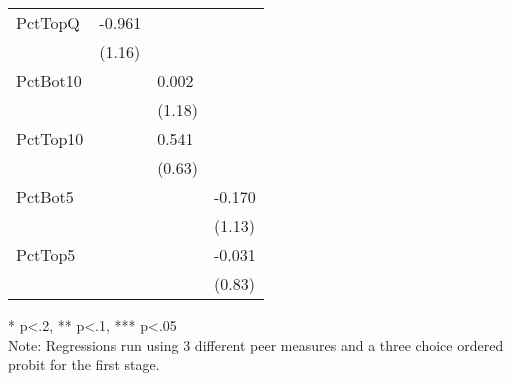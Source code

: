 \begin{table}[htb]
\begin{threeparttable}
\begin{tabular}{l l l l}
      PctTopQ  & -0.961                        &                               &                              \\
               & (1.16)                        &                               &                              \\
      PctBot10 &                               & 0.002                         &                              \\
               &                               & (1.18)                        &                              \\
      PctTop10 &                               & 0.541                         &                              \\
               &                               & (0.63)                        &                              \\
      PctBot5  &                               &                               & -0.170                       \\
               &                               &                               & (1.13)                       \\
      PctTop5  &                               &                               & -0.031                       \\
               &                               &                               & (0.83)                       \\
      \hline
      \hline
    \end{tabular}
    \begin{tablenotes}
    \item{* p<.2, ** p<.1, *** p<.05 \\Note: Regressions run using 3 different peer measures and a three choice ordered probit for the first stage.}
    \end{tablenotes}
    \centering
    \thepage
  \end{threeparttable}
\end{table}

\restoregeometry{}
\doublespacing

\clearpage{}

